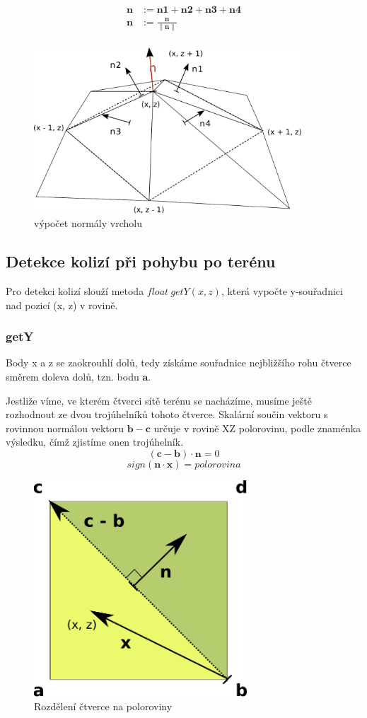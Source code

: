 \documentclass[11pt]{article}
\begin{document}
\begin{align*}
\mathbf n &:= \mathbf {n1} + \mathbf {n2} + \mathbf {n3} + \mathbf {n4} \\
\mathbf n &:= \frac{\mathbf n}{\|\mathbf n\|} \\
\end{align*}

\begin{figure}[ht!]
\centering
	\includegraphics[width=10cm]{normals_persp.pdf}
	\caption{výpočet normály vrcholu}
\end{figure}

\subsection{Detekce kolizí při pohybu po terénu}
Pro detekci kolizí slouží metoda $float~getY(x, z)$, která vypočte y-souřadnici
nad pozicí (x, z) v rovině.

\subsubsection{getY}
Body x a z se zaokrouhlí dolů, tedy získáme souřadnice nejbližšího rohu čtverce
směrem doleva dolů, tzn. bodu $\mathbf a$.

Jestliže víme, ve kterém čtverci sítě terénu se nacházíme, musíme ještě
rozhodnout ze dvou trojúhelníků tohoto čtverce. Skalární součin vektoru s
rovinnou normálou vektoru $\mathbf b - \mathbf c$ určuje v rovině XZ
polorovinu, podle znaménka výsledku, čímž zjistíme onen trojúhelník.  
$$
(\mathbf
c - \mathbf b) \cdot \mathbf n = 0
$$
$$
sign(\mathbf n \cdot \mathbf x) = polorovina
$$


\begin{figure}[ht!]
\centering
\includegraphics[width=8cm]{triangl.pdf}
	\caption{Rozdělení čtverce na poloroviny}
\end{figure}
\end{document}
